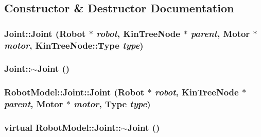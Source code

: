 \subsection{Constructor \& Destructor Documentation}
\hypertarget{class_robot_model_1_1_joint_ac0077acd1f45742c84c3468cce889600}{
\subsubsection[{Joint}]{\setlength{\rightskip}{0pt plus 5cm}Joint::Joint ({\bf Robot} $\ast$ {\em robot}, \/  {\bf KinTreeNode} $\ast$ {\em parent}, \/  {\bf Motor} $\ast$ {\em motor}, \/  {\bf KinTreeNode::Type} {\em type})}}
\label{class_robot_model_1_1_joint_ac0077acd1f45742c84c3468cce889600}
\hypertarget{class_robot_model_1_1_joint_a42aca0bd1832136984923713127c28f1}{
\subsubsection[{$\sim$Joint}]{\setlength{\rightskip}{0pt plus 5cm}Joint::$\sim$Joint ()}}
\label{class_robot_model_1_1_joint_a42aca0bd1832136984923713127c28f1}
\hypertarget{class_robot_model_1_1_joint_ace81033ec821f5bcb7e15c5ac1a84946}{
\subsubsection[{Joint}]{\setlength{\rightskip}{0pt plus 5cm}RobotModel::Joint::Joint ({\bf Robot} $\ast$ {\em robot}, \/  {\bf KinTreeNode} $\ast$ {\em parent}, \/  {\bf Motor} $\ast$ {\em motor}, \/  {\bf Type} {\em type})}}
\label{class_robot_model_1_1_joint_ace81033ec821f5bcb7e15c5ac1a84946}
\hypertarget{class_robot_model_1_1_joint_a191470d2376b08f2f3debc15d5e89ad0}{
\subsubsection[{$\sim$Joint}]{\setlength{\rightskip}{0pt plus 5cm}virtual RobotModel::Joint::$\sim$Joint ()}}
\label{class_robot_model_1_1_joint_a191470d2376b08f2f3debc15d5e89ad0}


